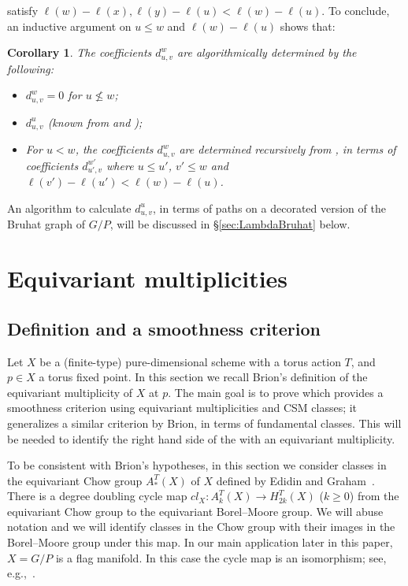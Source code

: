 \documentclass[11pt]{article}
\newtheorem{corol}[theo]{Corollary}
\theoremstyle{definition}
\numberwithin{equation}{section}
\begin{document}
 satisfy $\ell(w)-\ell(x), \ell(y) - \ell(u) < \ell(w)- \ell(u)$.
To conclude, an inductive argument on $u \le w$ and $\ell(w) - \ell(u)$ shows that:
\begin{corol}\label{cor:SMLR} The coefficients $d_{u,v}^w$ are algorithmically determined
	by the following:
	\begin{itemize}
		\item $d_{u,v}^w =0$ for $u \nleq w$;
		
		\item $d_{u,v}^u$ (known from  and );
		
		\item For $u < w$, the coefficients $d_{u,v}^w$ are determined recursively from
		, in terms of coefficients
		$d_{u',v}^{w'}$ where $u \le u'$, $v' \le w$ and $\ell(v') - \ell(u') < \ell(w) - \ell(u)$. 
	\end{itemize}
\end{corol}
An algorithm to calculate $d_{u,v}^u$, in terms of paths on a decorated version of the Bruhat graph of
$G/P$, will be discussed in \S\ref{sec:LambdaBruhat} below.

\section{Equivariant multiplicities} \label{sec:equimult}

\subsection{Definition and a smoothness criterion} Let $X$ be a (finite-type) 
	pure-dimensional scheme with a torus action $T$, and $p \in X$ a
torus fixed point. In this section we recall
Brion's definition of the equivariant multiplicity of $X$ at $p$.
The main goal is to prove 
 which provides a smoothness criterion using
equivariant multiplicities and CSM
classes; it generalizes a similar criterion
by Brion, in terms of fundamental classes. This will be needed to 
identify the right hand side of the  
with an equivariant multiplicity.

{To be consistent
	with Brion's hypotheses, in this section we consider classes in 
	the equivariant Chow group $A_*^T(X)$ of $X$ defined by 
	Edidin and Graham~\cite{edidin.graham:eqchow}.
	There is a degree doubling cycle map $cl_X: A_k^T(X) \to H_{2k}^T(X)$ ($k \ge 0$) from 
	the equivariant Chow group to the equivariant Borel--Moore group. We will abuse notation
	and we will identify classes
	in the Chow group with their images in the Borel--Moore group under this map. 
	In our main application later in this paper,
	$X=G/P$ is a flag manifold. In this case 
	the cycle map is an isomorphism; see, e.g.,~\cite[\S 3.2,~Cor.~2]{brion:eq-chow}.}
\end{document}
